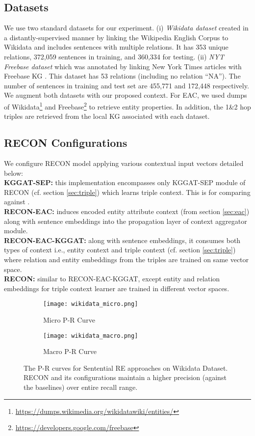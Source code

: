 \documentclass[sigconf]{acmart}
\begin{document}
\subsection{Datasets} 
We use two standard datasets for our experiment. (i) \textit{Wikidata dataset} \cite{DBLP:conf/emnlp/SorokinG17} created in a distantly-supervised manner by linking the Wikipedia English Corpus to Wikidata and includes sentences with multiple relations. 
It has 353 unique relations, 372,059 sentences in training, and 360,334 for testing.
(ii) \textit{NYT Freebase dataset} which was annotated by linking New York Times articles with Freebase KG \cite{DBLP:conf/pkdd/RiedelYM10}. This dataset has 53 relations (including no relation “NA”). The number of sentences in training and test set are 455,771 and 172,448 respectively.
We augment both datasets with our proposed context. For EAC, we used dumps of Wikidata\footnote{\url{https://dumps.wikimedia.org/wikidatawiki/entities/}} and Freebase\footnote{\url{https://developers.google.com/freebase}} to retrieve entity properties. In addition, the 1\&2 hop triples are retrieved from the local KG associated with each dataset.


\subsection{RECON Configurations}
We configure RECON model applying various contextual input vectors detailed below:\\
\textbf{KGGAT-SEP:} this implementation encompasses only KGGAT-SEP module of RECON (cf. section \ref{sec:triple}) which learns triple context. This is for comparing against \cite{DBLP:conf/acl/NathaniCSK19}. \\
\textbf{RECON-EAC:} induces encoded entity attribute context (from section \ref{sec:eac}) along with sentence embeddings into the propagation layer of context aggregator module. \\
\textbf{RECON-EAC-KGGAT:} along with sentence embeddings, it consumes both types of context i.e., entity context and triple context (cf. section \ref{sec:triple}) where relation and entity embeddings from the triples are trained on same vector space. \\
\textbf{RECON:} similar to RECON-EAC-KGGAT, except entity and relation embeddings for triple context learner are trained in different vector spaces.


\begin{figure*}
  \begin{subfigure}[b]{0.41\textwidth}
    \texttt{[image: wikidata\_micro.png]}
    \caption{Micro P-R Curve}
    \label{fig:1}
\end{subfigure}
\begin{subfigure}[b]{0.41\textwidth}
    \texttt{[image: wikidata\_macro.png]}
    \caption{Macro P-R Curve}
    \label{fig:2}
\end{subfigure}
  \caption{The P-R curves for Sentential RE approaches on Wikidata Dataset. RECON and its configurations maintain a higher precision (against the baselines) over entire recall range.}
  \label{fig:prcurve}
      \vspace{-3mm}
\end{figure*}
\end{document}
